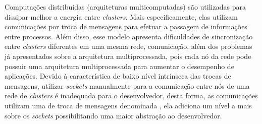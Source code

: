 %
%
%
%
%
%



Computações distribuídas (arquiteturas multicomputadas) são utilizadas para dissipar melhor a energia entre \textit{clusters}. Mais especificamente, elas utilizam comunicações por troca de mensagens para efetuar a passagem de informações entre processos. Além disso, esse modelo apresenta dificuldades de sincronização entre \textit{clusters} diferentes em uma mesma rede, comunicação, além dos problemas já apresentados sobre a arquitetura multiprocessada, pois cada nó da rede pode possuir uma arquitetura multiprocessada para aumentar o desempenho de aplicações.
Devido à característica de baixo nível intrínseca das trocas de mensagens, utilizar \textit{sockets} manualmente para a comunicação entre nós de uma rede de \textit{clusters} é inadequada para o desenvolvedor, desta forma, as comunicações utilizam uma \api de troca de mensagens denominada \MPI, ela adiciona um nível a mais sobre os \textit{sockets} possibilitando uma maior abstração ao desenvolvedor.



